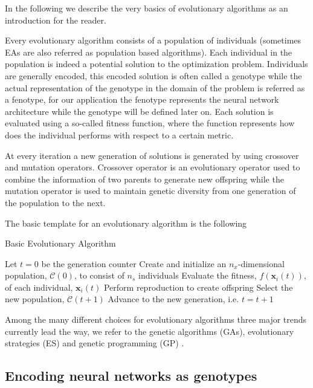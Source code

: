 \documentclass{article}
\begin{document}
In the following we describe the very basics of evolutionary algorithms as an introduction for the reader. 

Every evolutionary algorithm consists of a population of individuals (sometimes EAs are also referred as population based algorithms). Each individual in the population is indeed a potential solution to the optimization problem. Individuals are generally encoded, this encoded solution is often called a genotype while the actual representation of the genotype in the domain of the problem is referred as a fenotype, for our application the fenotype represents the neural network architecture while the genotype will be defined later on. Each solution is evaluated using a so-called fitness function, where the function represents how does the individual performs with respect to a certain metric. 

At every iteration a new generation of solutions is generated by using crossover and mutation operators. Crossover operator is an evolutionary operator used to combine the information of two parents to generate new offspring while the mutation operator is used to maintain genetic diversity from one generation of the population to the next.

The basic template for an evolutionary algorithm is the following

\begin{algorithm}[!htb]
\caption{Basic Evolutionary Algorithm}\label{euclid}
\begin{algorithmic}
\State Let $t = 0$ be the generation counter
\State Create and initialize an $n_x$-dimensional population, $\mathcal{C}(0)$, to consist of $n_s$ individuals
	\State Evaluate the fitness, $f(\mathbf{x}_i(t))$, of each individual, $\mathbf{x}_i(t)$
	\State Perform reproduction to create offspring
	\State Select the new population, $\mathcal{C}(t+1)$
	\State Advance to the new generation, i.e. $t = t +1$
\EndWhile
\end{algorithmic}
\end{algorithm}

Among the many different choices for evolutionary algorithms three major trends currently lead the way, we refer to the genetic algorithms (GAs), evolutionary strategies (ES) and genetic programming (GP) \cite{Engelbrecht2007}.

\subsection{Encoding neural networks as genotypes}
\end{document}
